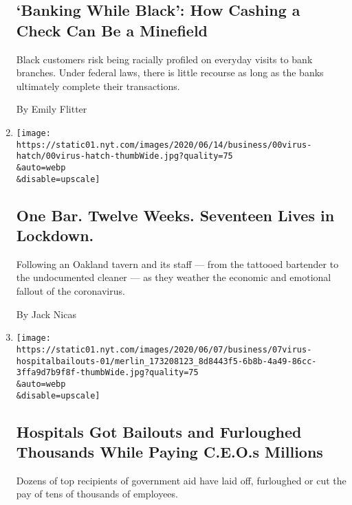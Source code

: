 \begin{enumerate}
  \hypertarget{banking-while-black-how-cashing-a-check-can-be-a-minefield}{%
  \subsection{`Banking While Black': How Cashing a Check Can Be a
  Minefield}\label{banking-while-black-how-cashing-a-check-can-be-a-minefield}}

  Black customers risk being racially profiled on everyday visits to
  bank branches. Under federal laws, there is little recourse as long as
  the banks ultimately complete their transactions.

  By Emily Flitter
\item
  \href{/2020/06/11/business/coronavirus-california-lockdown-small-business.html}{}

  \texttt{[image: https://static01.nyt.com/images/2020/06/14/business/00virus-hatch/00virus-hatch-thumbWide.jpg?quality=75\\\&auto=webp\\\&disable=upscale]}

  \hypertarget{one-bar-twelve-weeks-seventeen-lives-in-lockdown}{%
  \subsection{One Bar. Twelve Weeks. Seventeen Lives in
  Lockdown.}\label{one-bar-twelve-weeks-seventeen-lives-in-lockdown}}

  Following an Oakland tavern and its staff --- from the tattooed
  bartender to the undocumented cleaner --- as they weather the economic
  and emotional fallout of the coronavirus.

  By Jack Nicas
\item
  \href{/2020/06/08/business/hospitals-bailouts-ceo-pay.html}{}

  \texttt{[image: https://static01.nyt.com/images/2020/06/07/business/07virus-hospitalbailouts-01/merlin\_173208123\_8d8443f5-6b8b-4a49-86cc-3ffa9d7b9f8f-thumbWide.jpg?quality=75\\\&auto=webp\\\&disable=upscale]}

  \hypertarget{hospitals-got-bailouts-and-furloughed-thousands-while-paying-ceos-millions}{%
  \subsection{Hospitals Got Bailouts and Furloughed Thousands While
  Paying C.E.O.s
  Millions}\label{hospitals-got-bailouts-and-furloughed-thousands-while-paying-ceos-millions}}

  Dozens of top recipients of government aid have laid off, furloughed
  or cut the pay of tens of thousands of employees.


\end{enumerate}
